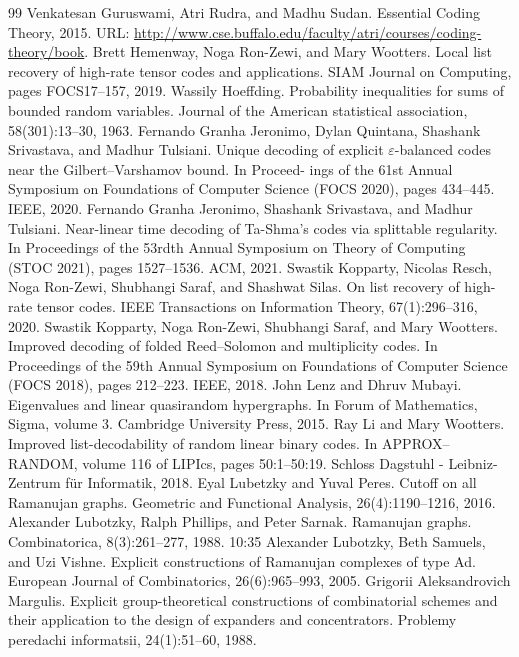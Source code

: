 \begin{thebibliography}{99}
 Venkatesan Guruswami, Atri Rudra, and Madhu Sudan. Essential Coding Theory, 2015. URL: \url{http://www.cse.buffalo.edu/faculty/atri/courses/coding-theory/book}.
 Brett Hemenway, Noga Ron-Zewi, and Mary Wootters. Local list recovery of high-rate tensor codes and applications. SIAM Journal on Computing, pages FOCS17–157, 2019.
 Wassily Hoeffding. Probability inequalities for sums of bounded random variables. Journal of the American statistical association, 58(301):13–30, 1963.
 Fernando Granha Jeronimo, Dylan Quintana, Shashank Srivastava, and Madhur Tulsiani. Unique decoding of explicit \(\varepsilon\)-balanced codes near the Gilbert–Varshamov bound. In Proceed- ings of the 61st Annual Symposium on Foundations of Computer Science (FOCS 2020), pages 434–445. IEEE, 2020.
 Fernando Granha Jeronimo, Shashank Srivastava, and Madhur Tulsiani. Near-linear time decoding of Ta-Shma’s codes via splittable regularity. In Proceedings of the 53rdth Annual Symposium on Theory of Computing (STOC 2021), pages 1527–1536. ACM, 2021.
 Swastik Kopparty, Nicolas Resch, Noga Ron-Zewi, Shubhangi Saraf, and Shashwat Silas. On list recovery of high-rate tensor codes. IEEE Transactions on Information Theory, 67(1):296–316, 2020.
 Swastik Kopparty, Noga Ron-Zewi, Shubhangi Saraf, and Mary Wootters. Improved decoding of folded Reed–Solomon and multiplicity codes. In Proceedings of the 59th Annual Symposium on Foundations of Computer Science (FOCS 2018), pages 212–223. IEEE, 2018.
 John Lenz and Dhruv Mubayi. Eigenvalues and linear quasirandom hypergraphs. In Forum of Mathematics, Sigma, volume 3. Cambridge University Press, 2015.
 Ray Li and Mary Wootters. Improved list-decodability of random linear binary codes. In APPROX–RANDOM, volume 116 of LIPIcs, pages 50:1–50:19. Schloss Dagstuhl - Leibniz- Zentrum für Informatik, 2018.
 Eyal Lubetzky and Yuval Peres. Cutoff on all Ramanujan graphs. Geometric and Functional Analysis, 26(4):1190–1216, 2016.
 Alexander Lubotzky, Ralph Phillips, and Peter Sarnak. Ramanujan graphs. Combinatorica, 8(3):261–277, 1988. 10:35
 Alexander Lubotzky, Beth Samuels, and Uzi Vishne. Explicit constructions of Ramanujan complexes of type Ad. European Journal of Combinatorics, 26(6):965–993, 2005.
 Grigorii Aleksandrovich Margulis. Explicit group-theoretical constructions of combinatorial schemes and their application to the design of expanders and concentrators. Problemy peredachi informatsii, 24(1):51–60, 1988.

\end{thebibliography}
